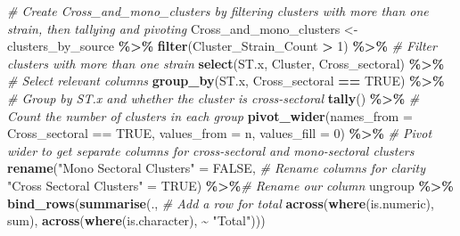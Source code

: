 \documentclass[
]{article}
\newenvironment{Shaded}{\begin{snugshade}}{\end{snugshade}}
\newcommand{\AttributeTok}[1]{\textcolor[rgb]{0.13,0.29,0.53}{#1}}
\newcommand{\CommentTok}[1]{\textcolor[rgb]{0.56,0.35,0.01}{\textit{#1}}}
\newcommand{\ConstantTok}[1]{\textcolor[rgb]{0.56,0.35,0.01}{#1}}
\newcommand{\DecValTok}[1]{\textcolor[rgb]{0.00,0.00,0.81}{#1}}
\newcommand{\FunctionTok}[1]{\textcolor[rgb]{0.13,0.29,0.53}{\textbf{#1}}}
\newcommand{\NormalTok}[1]{#1}
\newcommand{\OtherTok}[1]{\textcolor[rgb]{0.56,0.35,0.01}{#1}}
\newcommand{\SpecialCharTok}[1]{\textcolor[rgb]{0.81,0.36,0.00}{\textbf{#1}}}
\newcommand{\StringTok}[1]{\textcolor[rgb]{0.31,0.60,0.02}{#1}}
\begin{document}
\begin{Shaded}
\begin{Highlighting}[]
\CommentTok{\# Create Cross\_and\_mono\_clusters by filtering clusters with more than one strain, then tallying and pivoting}
\NormalTok{Cross\_and\_mono\_clusters }\OtherTok{\textless{}{-}}\NormalTok{ clusters\_by\_source }\SpecialCharTok{\%\textgreater{}\%}
  \FunctionTok{filter}\NormalTok{(Cluster\_Strain\_Count }\SpecialCharTok{\textgreater{}} \DecValTok{1}\NormalTok{) }\SpecialCharTok{\%\textgreater{}\%}          \CommentTok{\# Filter clusters with more than one strain}
  \FunctionTok{select}\NormalTok{(ST.x, Cluster, Cross\_sectoral) }\SpecialCharTok{\%\textgreater{}\%}     \CommentTok{\# Select relevant columns}
  \FunctionTok{group\_by}\NormalTok{(ST.x, Cross\_sectoral }\SpecialCharTok{==} \ConstantTok{TRUE}\NormalTok{) }\SpecialCharTok{\%\textgreater{}\%}    \CommentTok{\# Group by ST.x and whether the cluster is cross{-}sectoral}
  \FunctionTok{tally}\NormalTok{() }\SpecialCharTok{\%\textgreater{}\%}                                   \CommentTok{\# Count the number of clusters in each group}
  \FunctionTok{pivot\_wider}\NormalTok{(}\AttributeTok{names\_from =} \StringTok{\textasciigrave{}}\AttributeTok{Cross\_sectoral == TRUE}\StringTok{\textasciigrave{}}\NormalTok{, }\AttributeTok{values\_from =}\NormalTok{ n, }\AttributeTok{values\_fill =} \DecValTok{0}\NormalTok{) }\SpecialCharTok{\%\textgreater{}\%} \CommentTok{\# Pivot wider to get separate columns for cross{-}sectoral and mono{-}sectoral clusters}
  \FunctionTok{rename}\NormalTok{(}\StringTok{"Mono Sectoral Clusters"} \OtherTok{=} \StringTok{\textasciigrave{}}\AttributeTok{FALSE}\StringTok{\textasciigrave{}}\NormalTok{,    }\CommentTok{\# Rename columns for clarity}
         \StringTok{"Cross Sectoral Clusters"} \OtherTok{=} \StringTok{\textasciigrave{}}\AttributeTok{TRUE}\StringTok{\textasciigrave{}}\NormalTok{) }\SpecialCharTok{\%\textgreater{}\%}\CommentTok{\# Rename our column}
\NormalTok{  ungroup }\SpecialCharTok{\%\textgreater{}\%}
  \FunctionTok{bind\_rows}\NormalTok{(}\FunctionTok{summarise}\NormalTok{(.,                        }\CommentTok{\# Add a row for total}
                      \FunctionTok{across}\NormalTok{(}\FunctionTok{where}\NormalTok{(is.numeric), sum),}
                      \FunctionTok{across}\NormalTok{(}\FunctionTok{where}\NormalTok{(is.character), }\SpecialCharTok{\textasciitilde{}} \StringTok{"Total"}\NormalTok{)))}


\end{Highlighting}
\end{Shaded}
\end{document}
